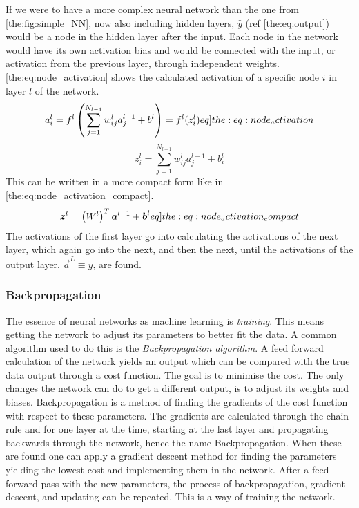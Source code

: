             If we were to have a more complex neural network than the one from \cref{the:fig:simple_NN}, now also including hidden layers, $\hat{y}$ (ref \cref{the:eq:output}) would be a node in the hidden layer after the input. Each node in the network would have its own activation bias and would be connected with the input, or activation from the previous layer, through independent weights. \cref{the:eq:node_activation} shows the calculated activation of a specific node $i$ in layer $l$ of the network.
            \begin{equation}
                a^l_i = f^l \pclosed{\sum_{j=1}^{N_{l-1}} w_{ij}^l a_j^{l-1} + b^l} = f^l(z^l_i)
            \label[eq]{the:eq:node_activation}
            \end{equation}  
            \begin{equation}
                z^l_i = \sum_{j=1}^{N_{l-1}} w_{ij}^l a_j^{l-1} + b_i^l
            \end{equation}
            This can be written in a more compact form like in \cref{the:eq:node_activation_compact}.
            \begin{equation}
                \vec{z}^l = \pclosed{W^l}^T\vec{a}^{l-1} + \vec{b}^l
                \label[eq]{the:eq:node_activation_compact}
            \end{equation}
            The activations of the first layer go into calculating the activations of the next layer, which again go into the next, and then the next, until the activations of the output layer, $\vec{a}^L \equiv \hat{y}$, are found. 



        \subsubsection{Backpropagation}
            The essence of neural networks as machine learning is \textit{training}. This means getting the network to adjust its parameters to better fit the data. A common algorithm used to do this is the \textit{Backpropagation algorithm}. A feed forward calculation of the network yields an output which can be compared with the true data output through a cost function. The goal is to minimise the cost. The only changes the network can do to get a different output, is to adjust its weights and biases. Backpropagation is a method of finding the gradients of the cost function with respect to these parameters. The gradients are calculated through the chain rule and for one layer at the time, starting at the last layer and propagating backwards through the network, hence the name Backpropagation. When these are found one can apply a gradient descent method for finding the parameters yielding the lowest cost and implementing them in the network. After a feed forward pass with the new parameters, the process of backpropagation, gradient descent, and updating can be repeated. This is a way of training the network.     
            
